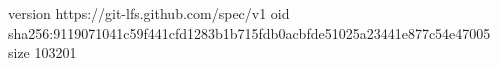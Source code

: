 version https://git-lfs.github.com/spec/v1
oid sha256:9119071041c59f441cfd1283b1b715fdb0acbfde51025a23441e877c54e47005
size 103201
